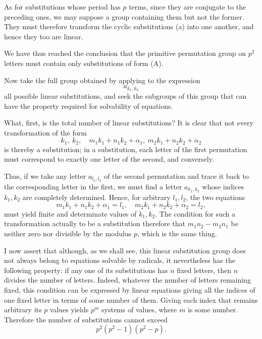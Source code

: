 As for substitutions whose period has $p$ terms, since they are conjugate to
the preceding ones, we may suppose a group containing them but not the former.
They must therefore transform the cyclic substitutions (a) into one another,
and hence they too are linear.


We have thus reached the conclusion that the primitive permutation group on
$p^{2}$ letters must contain only substitutions of form (A).

Now take the full group obtained by applying to the expression
\[
a_{k_{1},k_{2}}
\]
all possible linear substitutions, and seek the subgroups of this group that
can have the property required for solvability of equations.

What, first, is the total number of linear substitutions? It is clear that not
every transformation of the form
\[
k_{1},\ k_{2},\quad m_{1}k_{1} + n_{1}k_{2} + \alpha_{1},\ m_{2}k_{1} + n_{2}k_{2} + \alpha_{2}
\]
is thereby a substitution; in a substitution, each letter of the first
permutation must correspond to exactly one letter of the second, and conversely.

Thus, if we take any letter $a_{l_{1},l_{2}}$ of the second permutation and
trace it back to the corresponding letter in the first, we must find a letter
$a_{k_{1},k_{2}}$ whose indices $k_{1},k_{2}$ are completely determined.
Hence, for arbitrary $l_{1},l_{2}$, the two equations
\[
m_{1}k_{1} + n_{1}k_{2} + \alpha_{1} = l_{1}, \quad
m_{2}k_{1} + n_{2}k_{2} + \alpha_{2} = l_{2},
\]
must yield finite and determinate values of $k_{1},k_{2}$. The condition for
such a transformation actually to be a substitution
 therefore that
$m_{1}n_{2}-m_{2}n_{1}$ be neither zero nor divisible by the modulus $p$,
which is the same thing.

I now assert that although, as we shall see, this linear substitution group
does not always belong to equations solvable by radicals, it nevertheless has
the following property: if any one of its substitutions has $n$ fixed letters,
then $n$ divides the number of letters. Indeed, whatever the number of letters
remaining fixed, this condition can be expressed by linear equations giving
all the indices of one fixed letter in terms of some number of them. Giving
each index that remains arbitrary its $p$ values yields $p^{m}$ systems of
values, where $m$ is some number.  Therefore
the number of substitutions cannot exceed
\[
p^{2}(p^{2} - 1)(p^{2} - p).
\]

